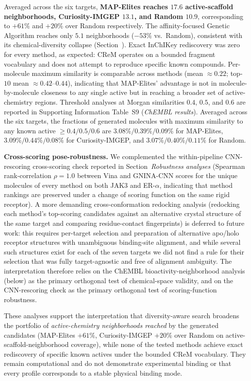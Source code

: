 \documentclass[journal=jcisd8,manuscript=article]{achemso}
\begin{document}
Averaged across the six targets, \textbf{MAP-Elites reaches $17.6$ active-scaffold neighborhoods, Curiosity-IMGEP $13.1$, and Random $10.9$}, corresponding to $+61\%$ and $+20\%$ over Random respectively. The affinity-focused Genetic Algorithm reaches only $5.1$ neighborhoods ($-53\%$ vs.\ Random), consistent with its chemical-diversity collapse (Section~). Exact InChIKey rediscovery was zero for every method, as expected: CReM operates on a bounded fragment vocabulary and does not attempt to reproduce specific known compounds. Per-molecule maximum similarity is comparable across methods (mean $\approx 0.22$; top-$10$ mean $\approx 0.42$--$0.44$), indicating that MAP-Elites' advantage is not in molecule-by-molecule closeness to any single active but in reaching a broader set of active-chemistry regions. Threshold analyses at Morgan similarities $0.4$, $0.5$, and $0.6$ are reported in Supporting Information Table~S9 (\emph{ChEMBL results}). Averaged across the six targets, the fractions of generated molecules with maximum similarity to any known active $\geq 0.4/0.5/0.6$ are $3.08\%/0.39\%/0.09\%$ for MAP-Elites, $3.09\%/0.44\%/0.08\%$ for Curiosity-IMGEP, and $3.07\%/0.40\%/0.11\%$ for Random.

\textbf{Cross-scoring pose-robustness.} We complemented the within-pipeline CNN-rescoring cross-scoring check reported in Section~\emph{Robustness analyses} (Spearman rank-correlation $\rho = 1.0$ between Vina and GNINA-CNN scores for the unique molecules of every method on both JAK3 and ER-$\alpha$, indicating that method rankings are preserved under a change of scoring function on the same rigid receptor). A more demanding cross-conformation redocking analysis (redocking each method's top-scoring candidates against an alternative crystal structure of the same target and comparing residue-contact fingerprints) is deferred to future work: this requires per-target selection and preparation of alternative apo/holo receptor structures with unambiguous binding-site alignment, and while several such structures exist for each of the seven targets we did not find a rule for their selection that was fully target-agnostic and free of alignment ambiguity. The interpretation therefore relies on the ChEMBL bioactivity-neighborhood analysis (below) as the primary orthogonal test of chemical-space validity, and on the CNN-rescoring check as the primary orthogonal test of scoring-function robustness.

These analyses support the interpretation that diversity-aware search broadens the portfolio of \emph{active-chemistry neighborhoods reached} by the generated candidates (MAP-Elites $+61\%$, Curiosity-IMGEP $+20\%$ over Random on active-scaffold-neighborhood coverage), while none of the tested methods achieve exact rediscovery of specific known actives under the bounded CReM vocabulary. They remain computational and do not demonstrate experimental binding or that every profile corresponds to a stable physical binding mode.
\end{document}
